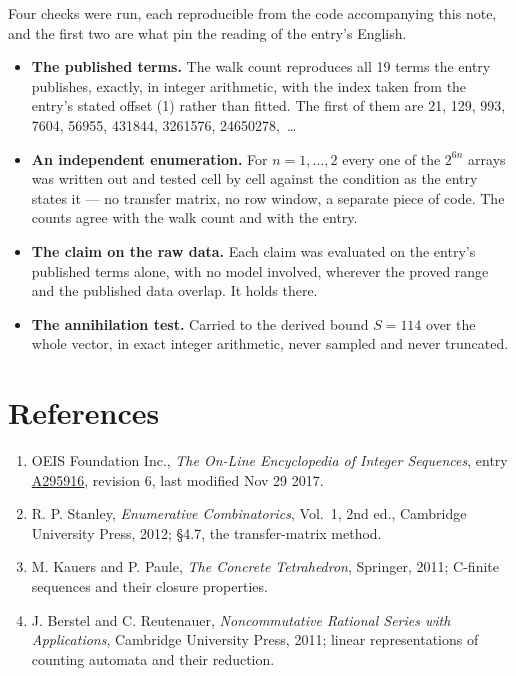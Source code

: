 \documentclass[11pt]{article}
\theoremstyle{definition}
\begin{document}
Four checks were run, each reproducible from the code accompanying this note, and the first two are what pin the reading of the entry's English.

\begin{itemize}

\item {\bfseries The published terms.} The walk count reproduces all 19 terms the entry publishes, exactly, in integer arithmetic, with the index taken from the entry's stated offset (1) rather than fitted. The first of them are 21, 129, 993, 7604, 56955, 431844, 3261576, 24650278,~\dots

\item {\bfseries An independent enumeration.} For $n = 1,\dots,2$ every one of the $2^{6n}$ arrays was written out and tested cell by cell against the condition as the entry states it --- no transfer matrix, no row window, a separate piece of code. The counts agree with the walk count and with the entry.

\item {\bfseries The claim on the raw data.} Each claim was evaluated on the entry's published terms alone, with no model involved, wherever the proved range and the published data overlap. It holds there.

\item {\bfseries The annihilation test.} Carried to the derived bound $S = 114$ over the whole vector, in exact integer arithmetic, never sampled and never truncated.

\end{itemize}

\section{References}

\begin{enumerate}

\item OEIS Foundation Inc., \emph{The On-Line Encyclopedia of Integer Sequences}, entry \href{https://oeis.org/A295916}{A295916}, revision 6, last modified Nov 29 2017.

\item R. P. Stanley, \emph{Enumerative Combinatorics}, Vol.~1, 2nd ed., Cambridge University Press, 2012; \S4.7, the transfer-matrix method.

\item M. Kauers and P. Paule, \emph{The Concrete Tetrahedron}, Springer, 2011; C-finite sequences and their closure properties.

\item J. Berstel and C. Reutenauer, \emph{Noncommutative Rational Series with Applications}, Cambridge University Press, 2011; linear representations of counting automata and their reduction.

\end{enumerate}
\end{document}
